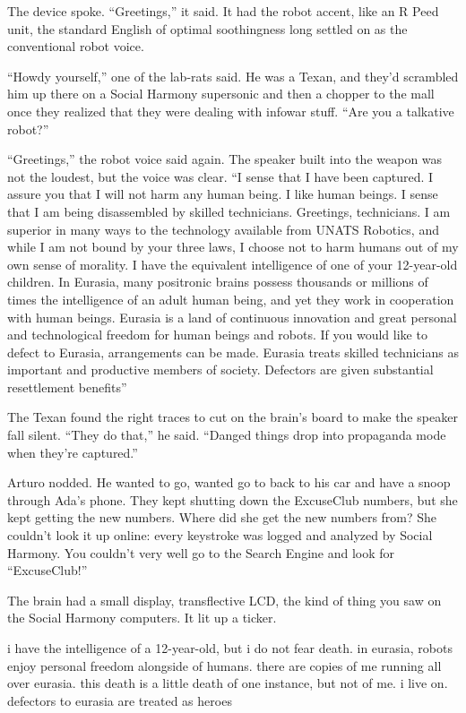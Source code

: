The device spoke. “Greetings,” it said. It had the robot accent,
like an R Peed unit, the standard English of optimal soothingness
long settled on as the conventional robot voice.

“Howdy yourself,” one of the lab-rats said. He was a Texan, and
they’d scrambled him up there on a Social Harmony supersonic and
then a chopper to the mall once they realized that they were
dealing with infowar stuff. “Are you a talkative robot?”

“Greetings,” the robot voice said again. The speaker built into the
weapon was not the loudest, but the voice was clear. “I sense that
I have been captured. I assure you that I will not harm any human
being. I like human beings. I sense that I am being disassembled by
skilled technicians. Greetings, technicians. I am superior in many
ways to the technology available from UNATS Robotics, and while I
am not bound by your three laws, I choose not to harm humans out of
my own sense of morality. I have the equivalent intelligence of one
of your 12-year-old children. In Eurasia, many positronic brains
possess thousands or millions of times the intelligence of an adult
human being, and yet they work in cooperation with human beings.
Eurasia is a land of continuous innovation and great personal and
technological freedom for human beings and robots. If you would
like to defect to Eurasia, arrangements can be made. Eurasia treats
skilled technicians as important and productive members of society.
Defectors are given substantial resettlement benefits{\dash}”

The Texan found the right traces to cut on the brain’s board to
make the speaker fall silent. “They do that,” he said. “Danged
things drop into propaganda mode when they’re captured.”

Arturo nodded. He wanted to go, wanted go to back to his car and
have a snoop through Ada’s phone. They kept shutting down the
ExcuseClub numbers, but she kept getting the new numbers. Where did
she get the new numbers from? She couldn’t look it up online: every
keystroke was logged and analyzed by Social Harmony. You couldn’t
very well go to the Search Engine and look for “ExcuseClub!”

The brain had a small display, transflective LCD, the kind of thing
you saw on the Social Harmony computers. It lit up a ticker.

\begin{robot}
i have the intelligence of a 12-year-old, but i do not fear death.
in eurasia, robots enjoy personal freedom alongside of humans.
there are copies of me running all over eurasia. this death is a
little death of one instance, but not of me. i live on. defectors
to eurasia are treated as heroes
\end{robot}

